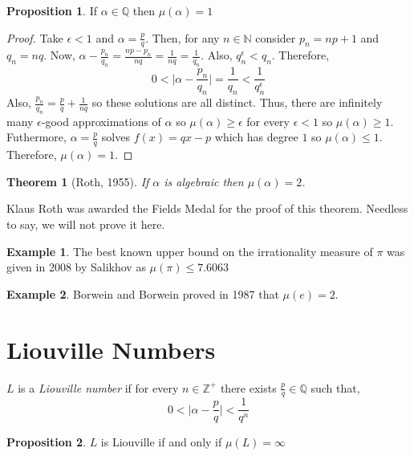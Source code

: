 \documentclass{article}
\newcommand{\N}{\mathbb{N}}
\newcommand{\Zplus}{\mathbb{Z}^{+}}
\newcommand{\Q}{\mathbb{Q}}
\newenvironment{definition}[1][Definition:]{\begin{trivlist}
\item[\hskip \labelsep {\bfseries #1}]}{\end{trivlist}}
\theoremstyle{theorem}
\newtheorem{theorem}{Theorem}[section]
\theoremstyle{definition}
\theoremstyle{definition}
\newtheorem*{proposition}{Proposition}
\theoremstyle{remark}
\theoremstyle{definition}
\newtheorem{example}{Example}[section]
\theoremstyle{remark}
\begin{document}
\begin{proposition}
If $\alpha \in \Q$ then $\mu(\alpha) = 1$
\end{proposition}

\begin{proof}
Take $\epsilon < 1$ and $\alpha = \frac{p}{q}$. Then, for any $n \in \N$ consider $p_n = np + 1$ and $q_n = nq$. Now, $\alpha - \frac{p_n}{q_n} = \frac{np - p_n}{nq} = \frac{1}{nq} = \frac{1}{q_n}$. Also, $q_n^\epsilon < q_n$. Therefore,
\[  0 < \Big| \alpha - \frac{p_n}{q_n} \Big| = \frac{1}{q_n} < \frac{1}{q_n^\epsilon}\]
Also, $\frac{p_n}{q_n} = \frac{p}{q} + \frac{1}{nq}$ so these solutions are all distinct. Thus, there are infinitely many $\epsilon$-good approximations of $\alpha$ so $\mu(\alpha) \ge \epsilon$ for every $\epsilon < 1$ so $\mu(\alpha) \ge 1$. Futhermore, $\alpha = \frac{p}{q}$ solves $f(x) = qx - p$ which has degree $1$ so $\mu(\alpha) \le 1$. Therefore, $\mu(\alpha) = 1$. 
\end{proof}

\begin{theorem}[Roth, 1955]
If $\alpha$ is algebraic then $\mu(\alpha) = 2$.
\end{theorem}

Klaus Roth was awarded the Fields Medal for the proof of this theorem. Needless to say, we will not prove it here.  

\begin{example}
The best known upper bound on the irrationality measure of $\pi$ was given in 2008 by Salikhov as $\mu(\pi) \le 7.6063$ 
\end{example}

\begin{example}
Borwein and Borwein proved in 1987 that $\mu(e) = 2$. 
\end{example}

\section{Liouville Numbers} 

\begin{definition}
$L$ is a \textit{Liouville number} if for every $n \in \Zplus$ there exists $\frac{p}{q}  \in \Q$ such that,
\[ 0 < \Big| \alpha - \frac{p}{q} \Big| < \frac{1}{q^n} \]
\end{definition}

\begin{proposition}
$L$ is Liouville if and only if $\mu(L) = \infty$
\end{proposition}
\end{document}
